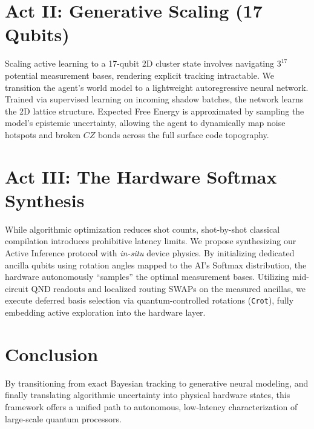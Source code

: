 \documentclass[twocolumn, 10pt, letterpaper]{article}
\begin{document}
\section{Act II: Generative Scaling (17 Qubits)}
Scaling active learning to a 17-qubit 2D cluster state involves navigating $3^{17}$ potential measurement bases, rendering explicit tracking intractable. We transition the agent's world model to a lightweight autoregressive neural network. Trained via supervised learning on incoming shadow batches, the network learns the 2D lattice structure. Expected Free Energy is approximated by sampling the model's epistemic uncertainty, allowing the agent to dynamically map noise hotspots and broken $CZ$ bonds across the full surface code topography.

\section{Act III: The Hardware Softmax Synthesis}
While algorithmic optimization reduces shot counts, shot-by-shot classical compilation introduces prohibitive latency limits. We propose synthesizing our Active Inference protocol with \textit{in-situ} device physics. By initializing dedicated ancilla qubits using rotation angles mapped to the AI's Softmax distribution, the hardware autonomously ``samples'' the optimal measurement bases. Utilizing mid-circuit QND readouts and localized routing SWAPs on the measured ancillas, we execute deferred basis selection via quantum-controlled rotations (\texttt{Crot}), fully embedding active exploration into the hardware layer.

\section{Conclusion}
By transitioning from exact Bayesian tracking to generative neural modeling, and finally translating algorithmic uncertainty into physical hardware states, this framework offers a unified path to autonomous, low-latency characterization of large-scale quantum processors.
\end{document}
